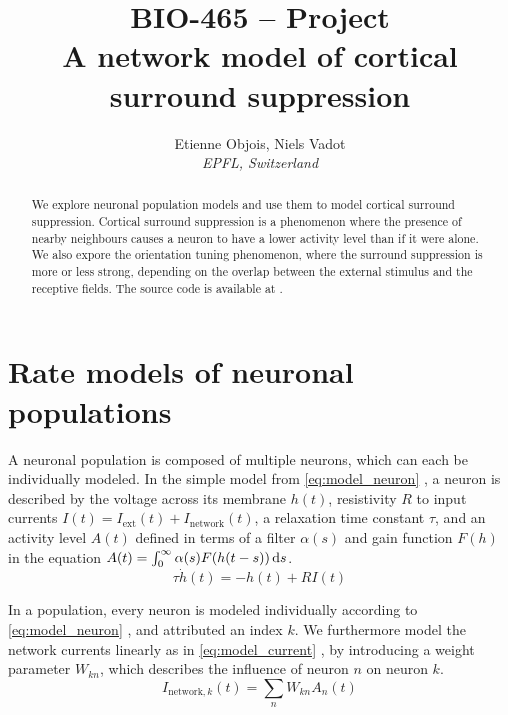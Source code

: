 \documentclass[10pt,conference,compsocconf,a4paper]{IEEEtran}
\newcommand*{\shortautoref}[1]{%
	\begingroup
	\def\equationautorefname{\textsc{Eq.}}%
	\def\tableautorefname{\textsc{Tab.}}%
	\def\figureautorefname{\textsc{Fig.}}%
	\autoref{#1}%
	\endgroup
}
\begin{document}
\title{BIO-465 -- Project\\A network model of cortical surround suppression}

\author{
	Etienne Objois, Niels Vadot\\
	\textit{EPFL, Switzerland}
}

\maketitle

\begin{abstract}
	We explore neuronal population models and use them to model cortical surround suppression.
	Cortical surround suppression is a phenomenon where the presence of nearby neighbours causes a neuron to have a lower activity level than if it were alone.
	We also expore the orientation tuning phenomenon, where the surround suppression is more or less strong, depending on the overlap between the external stimulus and the receptive fields.
	The source code is available at \cite{cs456_source}.
\end{abstract}

\section{Rate models of neuronal populations}

	A neuronal population is composed of multiple neurons, which can each be individually modeled. In the simple model from \shortautoref{eq:model_neuron}, a neuron is described by the voltage across its membrane $h(t)$, resistivity $R$ to input currents $I(t) = I_{\text{ext}}(t) + I_{\text{network}}(t)$, a relaxation time constant $\tau$, and an activity level $A(t)$ defined in terms of a filter $\alpha(s)$ and gain function $F(h)$ in the equation $A(t) = \int_0^\infty \alpha(s) F(h(t-s)) \dif{s}$.
\
	\begin{equation} \label{eq:model_neuron}
		\tau \dot h(t) = -h(t) + R I(t)
	\end{equation}

	In a population, every neuron is modeled individually according to \shortautoref{eq:model_neuron}, and attributed an index $k$. We furthermore model the network currents linearly as in \shortautoref{eq:model_current}, by introducing a weight parameter $W_{kn}$, which describes the influence of neuron $n$ on neuron $k$.
\
	\begin{equation} \label{eq:model_current}
		I_{\text{network},k}(t) = \sum_n W_{kn} A_n(t)
	\end{equation}
\end{document}
